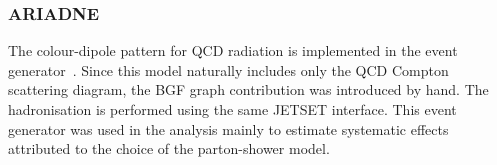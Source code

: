\subsubsection{ARIADNE}
The colour-dipole pattern for QCD radiation is implemented in the \ariadne event generator~\cite{ariadne}. Since this model naturally includes only the QCD Compton scattering diagram, the BGF graph contribution was introduced by hand. The hadronisation is performed using the same JETSET interface. This event generator was used in the analysis mainly to estimate systematic effects attributed to the choice of the parton-shower model.
%